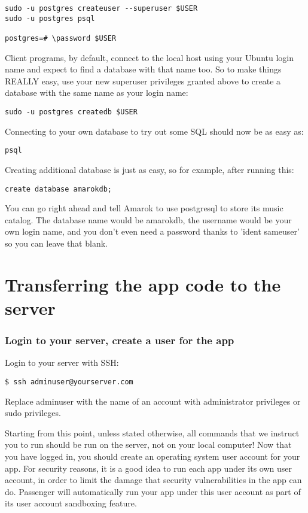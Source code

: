 \documentclass[11pt]{article}
\begin{document}
\begin{verbatim}
sudo -u postgres createuser --superuser $USER
sudo -u postgres psql

postgres=# \password $USER
\end{verbatim}

Client programs, by default, connect to the local host using your Ubuntu login name and expect to find a database with that name too. So to make things REALLY easy, use your new superuser privileges granted above to create a database with the same name as your login name:

\begin{verbatim}
sudo -u postgres createdb $USER
\end{verbatim}

Connecting to your own database to try out some SQL should now be as easy as:

\begin{verbatim}
psql
\end{verbatim}
Creating additional database is just as easy, so for example, after running this:

\begin{verbatim}
create database amarokdb;
\end{verbatim}

You can go right ahead and tell Amarok to use postgresql to store its music catalog. The database name would be amarokdb, the username would be your own login name, and you don't even need a password thanks to 'ident sameuser' so you can leave that blank. 

\section{Transferring the app code to the server}
\label{sec:org0a93ff3}

\subsubsection{Login to your server, create a user for the app}
\label{sec:org50f3a98}

Login to your server with SSH:
\begin{verbatim}
$ ssh adminuser@yourserver.com
\end{verbatim}

Replace adminuser with the name of an account with administrator privileges or sudo privileges.

Starting from this point, unless stated otherwise, all commands that we instruct you to run should be run on the server, not on your local computer!
Now that you have logged in, you should create an operating system user account for your app. For security reasons, it is a good idea to run each app under its own user account, in order to limit the damage that security vulnerabilities in the app can do. Passenger will automatically run your app under this user account as part of its user account sandboxing feature.
\end{document}
